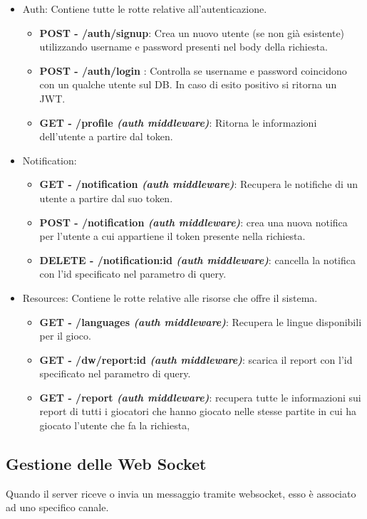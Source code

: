 \begin{itemize}
    \item Auth: Contiene tutte le rotte relative all'autenticazione.
    \begin{itemize}
        \item \textbf{POST - /auth/signup}: Crea un nuovo utente (se non già esistente) utilizzando username e password presenti nel body della richiesta.
        \item \textbf{POST - /auth/login} : Controlla se username e password coincidono con un qualche utente sul DB. In caso di esito positivo si ritorna un JWT.
        \item \textbf{GET - /profile \textit{(auth middleware)}}: Ritorna le informazioni dell'utente a partire dal token.
    \end{itemize}
    \item Notification:
    \begin{itemize}
        \item \textbf{GET - /notification \textit{(auth middleware)}}: Recupera le notifiche di un utente a partire dal suo token.
        \item \textbf{POST - /notification \textit{(auth middleware)}}: crea una nuova notifica per l'utente a cui appartiene il token presente nella richiesta.
        \item \textbf{DELETE - /notification:id \textit{(auth middleware)}}: cancella la notifica con l'id specificato nel parametro di query.
    \end{itemize}
            
    \item Resources: Contiene le rotte relative alle risorse che offre il sistema.
    \begin{itemize}
        \item \textbf{GET - /languages \textit{(auth middleware)}}: Recupera le lingue disponibili per il gioco.
        \item \textbf{GET - /dw/report:id \textit{(auth middleware)}}: scarica il report con l'id specificato nel parametro di query.
        \item \textbf{GET - /report \textit{(auth middleware)}}: recupera tutte le informazioni sui report di tutti i giocatori che hanno giocato nelle stesse partite in cui ha giocato l'utente che fa la richiesta,
    \end{itemize}
\end{itemize}


\subsection{Gestione delle Web Socket}
Quando il server riceve o invia un messaggio tramite websocket, esso è associato ad uno specifico canale.

